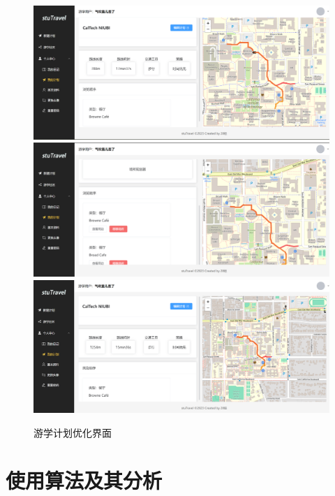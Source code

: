 \documentclass{report}
\begin{document}
\begin{figure}[h]
    \begin{center}
        \includegraphics*[width=\textwidth]{figure/2.5-pl.png}
        \includegraphics*[width=\textwidth]{figure/2.5-ed.png}
        \includegraphics*[width=\textwidth]{figure/2.5-opt.png}
    \end{center}
    \caption{游学计划优化界面}
\end{figure}

\chapter{使用算法及其分析}
\end{document}

